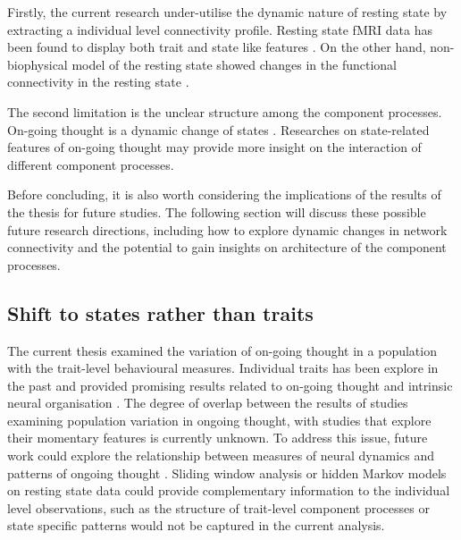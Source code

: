 Firstly, the current research under-utilise the dynamic nature of resting state by extracting a individual level connectivity profile. Resting state fMRI data has been found to display both trait and state like features \cite{Geerligs2015}. On the other hand, non-biophysical model of the resting state showed changes in the functional connectivity in the resting state \cite{Vidaurre2017}. 

The second limitation is the unclear structure among the component processes. On-going thought is a dynamic change of states \cite{KucyiNI2017}. Researches on state-related features of on-going thought may provide more insight on the interaction of different component processes.
 
Before concluding, it is also worth considering the implications of the results of the thesis for future studies. The following section will discuss these possible future research directions, including how to explore dynamic changes in network connectivity and the potential to gain insights on architecture of the component processes.

\subsection{Shift to states rather than traits}

The current thesis examined the variation of on-going thought in a population with the trait-level behavioural measures. Individual traits has been explore in the past and provided promising results related to on-going thought \cite{Smallwood2016,McVay2009,RubyPlos2013} and intrinsic neural organisation \cite{Smith2015}. The degree of overlap between the results of studies examining population variation in ongoing thought, with studies that explore their momentary features is currently unknown. To address this issue, future work could explore the relationship between measures of neural dynamics and patterns of ongoing thought \cite{KucyiNI2017}. Sliding window analysis \cite{Chang2010} or hidden Markov models \cite{Vidaurre2017} on resting state data could provide complementary information to the individual level observations, such as the structure of trait-level component processes or state specific patterns would not be captured in the current analysis.

